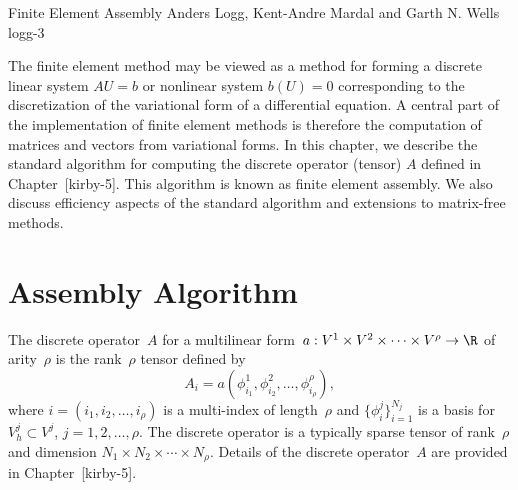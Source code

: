               {Finite Element Assembly}
              {Anders Logg, Kent-Andre Mardal and Garth N. Wells}
              {logg-3}

The finite element method may be viewed as a method for forming a
discrete linear system $AU = b$ or nonlinear system $b(U) = 0$
corresponding to the discretization of the variational form of a
differential equation. A central part of the implementation of finite
element methods is therefore the computation of matrices and vectors
from variational forms. In this chapter, we describe the standard
algorithm for computing the discrete operator (tensor) $A$ defined in
Chapter~[kirby-5]. This algorithm is known as finite element
assembly. We also discuss efficiency aspects of the standard algorithm
and extensions to matrix-free methods.

\section{Assembly Algorithm}

The discrete operator~$A$ for a multilinear form~$a : V^1 \times
V^2 \times \cdots \times V^{\rho} \rightarrow \R$ of arity~$\rho$ is
the rank~$\rho$ tensor defined by
\begin{displaymath}
  A_i = a(\phi^1_{i_1}, \phi^2_{i_2}, \ldots, \phi^{\rho}_{i_{\rho}}),
\end{displaymath}
where $i = (i_1, i_2, \ldots, i_{\rho})$ is a multi-index of
length~$\rho$ and $\{\phi^j_i\}_{i=1}^{N_j}$ is a basis for $V^j_h
\subset V^j$, $j = 1,2,\ldots,\rho$. The discrete operator is a
typically sparse tensor of rank~$\rho$ and dimension $N_1 \times N_2
\times \cdots \times N_{\rho}$.
Details of the discrete operator~$A$ are provided in
Chapter~[kirby-5].


